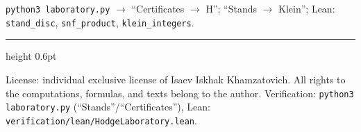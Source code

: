 \documentclass[11pt,a4paper]{article}
\theoremstyle{plain}
\theoremstyle{definition}
\theoremstyle{remark}
\begin{document}
\begin{verifybox}[reproduction]
\texttt{python3 laboratory.py} $\to$ ``Certificates $\to$ H'';
``Stands $\to$ Klein''; Lean: \texttt{stand\_disc},
\texttt{snf\_product}, \texttt{klein\_integers}.
\end{verifybox}

\vfill
{\color{linkblue}\hrule height 0.6pt}
\vspace{0.5em}
{\small\color{gray}
License: individual exclusive license of Isaev Iskhak Khamzatovich.
All rights to the computations, formulas, and texts belong to the author.
Verification: \texttt{python3 laboratory.py} (``Stands''/``Certificates''),
Lean: \texttt{verification/lean/HodgeLaboratory.lean}.
}
\end{document}
